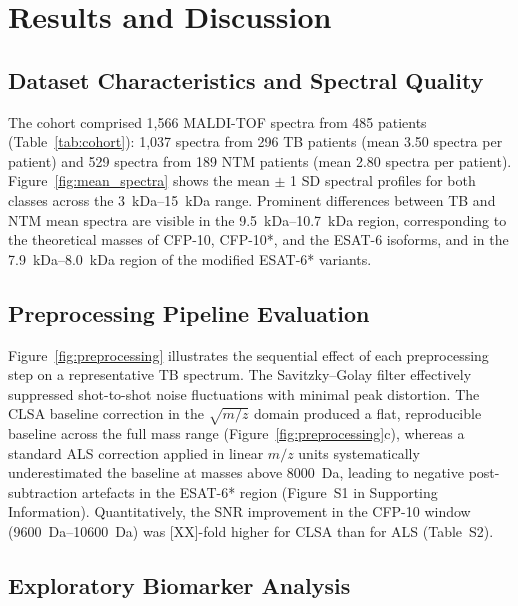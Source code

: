 \documentclass[journal=ancham, manuscript=article, layout=traditional]{achemso}
\begin{document}
\section{Results and Discussion}

\subsection{Dataset Characteristics and Spectral Quality}

The cohort comprised 1,566 MALDI-TOF spectra from 485 patients
(Table~\ref{tab:cohort}): 1,037 spectra from 296 TB patients (mean
3.50 spectra per patient) and 529 spectra from 189 NTM patients
(mean 2.80 spectra per patient).
Figure~\ref{fig:mean_spectra} shows the mean $\pm$ 1 SD spectral
profiles for both classes across the \SIrange{3}{15}{\kilo\dalton}
range.
Prominent differences between TB and NTM mean spectra are visible in
the \SIrange{9.5}{10.7}{\kilo\dalton} region, corresponding to the
theoretical masses of CFP-10, CFP-10*, and the ESAT-6 isoforms, and
in the \SIrange{7.9}{8.0}{\kilo\dalton} region of the modified ESAT-6*
variants.

\subsection{Preprocessing Pipeline Evaluation}

Figure~\ref{fig:preprocessing} illustrates the sequential effect of
each preprocessing step on a representative TB spectrum.
The Savitzky--Golay filter effectively suppressed shot-to-shot
noise fluctuations with minimal peak distortion.
The CLSA baseline correction in the $\sqrt{m/z}$ domain produced a
flat, reproducible baseline across the full mass range (Figure~\ref{fig:preprocessing}c),
whereas a standard ALS correction applied in linear $m/z$ units
systematically underestimated the baseline at masses above
\SI{8000}{\dalton}, leading to negative post-subtraction artefacts
in the ESAT-6* region (Figure~S1 in Supporting Information).
Quantitatively, the SNR improvement in the CFP-10 window
(\SIrange{9600}{10600}{\dalton}) was
[XX]-fold higher for CLSA than for ALS (Table~S2).

\subsection{Exploratory Biomarker Analysis}
\end{document}
